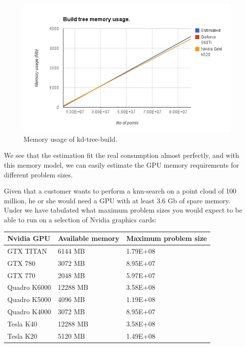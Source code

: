 \begin{figure}[ht!]
\centering
\includegraphics[width=120mm]{../gfx/memory-usage-build.png}

\caption{Memory usage of kd-tree-build.}
\label{fig:memory_usage_build}
\end{figure}

We see that the estimation fit the real consumption almost perfectly, and with this memory model, we can easily estimate the GPU memory requirements for different problem sizes.

Given that a customer wants to perform a knn-search on a point cloud of 100 million, he or she would need a GPU with at least 3.6 Gb of spare memory. Under we have tabulated what maximum problem sizes you would expect to be able to run on a selection of Nvidia graphics cards:

\begin{center}
    \begin{tabular}{ | l | l | p{5cm} |}
    \hline
    Nvidia GPU & Available memory & Maximum problem size \\ \hline
    GTX TITAN & 6144 MB & 1.79E+08 \\ \hline
    GTX 780 & 3072 MB & 8.95E+07 \\ \hline
    GTX 770 & 2048 MB & 5.97E+07 \\ \hline
    Quadro K6000 & 12288 MB & 3.58E+08 \\ \hline
    Quadro K5000 & 4096 MB & 1.19E+08 \\ \hline
    Quadro K4000 & 3072 MB & 8.95E+07 \\ \hline
    Tesla K40 & 12288 MB & 3.58E+08 \\ \hline
    Tesla K20 & 5120 MB & 1.49E+08 \\ \hline
    \end{tabular}
\end{center}

